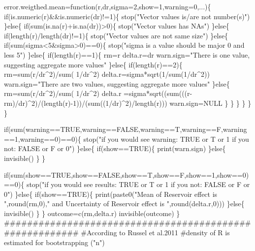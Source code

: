 \documentclass[
]{article}
\newenvironment{Shaded}{\begin{snugshade}}{\end{snugshade}}
\newcommand{\NormalTok}[1]{#1}
\begin{document}
\begin{Shaded}
\begin{Highlighting}[]
\NormalTok{error.weigthed.mean=function(r,dr,sigma=2,show=1,warning=0,...)\{}
\NormalTok{  if(is.numeric(r)\&\&is.numeric(dr)!=1)\{}
\NormalTok{    stop("Vector values is/are not number(s)") }
\NormalTok{  \}else\{  }
\NormalTok{    if(sum(is.na(r)+is.na(dr))\textgreater{}0)\{}
\NormalTok{      stop("Vector values has NAs") }
\NormalTok{    \}else\{ }
\NormalTok{      if(length(r)/length(dr)!=1)\{ }
\NormalTok{        stop("Vector values are not same size") }
\NormalTok{      \}else\{}
\NormalTok{        if(sum(sigma\textless{}5\&sigma\textgreater{}0)==0)\{}
\NormalTok{          stop("sigma is a value should be major 0 and less 5")}
\NormalTok{        \}else\{}
\NormalTok{          if(length(r)==1)\{}
\NormalTok{            rm=r}
\NormalTok{            delta.r=dr}
\NormalTok{            warn.sign="There is one value, suggesting aggregate more values"}
\NormalTok{          \}else\{    }
\NormalTok{          if(length(r)==2)\{}
\NormalTok{            rm=sum(r/dr\^{}2)/sum( 1/dr\^{}2)}
\NormalTok{            delta.r=sigma*sqrt(1/sum(1/dr\^{}2))}
\NormalTok{            warn.sign="There are two values, suggesting aggregate more values"}
\NormalTok{          \}else\{}
\NormalTok{            rm=sum(r/dr\^{}2)/sum( 1/dr\^{}2)}
\NormalTok{            delta.r =sigma*sqrt((sum(((r{-}rm)/dr)\^{}2)/(length(r){-}1))/(sum((1/dr)\^{}2)/length(r)))}
\NormalTok{            warn.sign=NULL}
\NormalTok{          \}}
\NormalTok{        \}}
\NormalTok{      \}}
\NormalTok{    \}}
\NormalTok{    \}}
\NormalTok{  \}}

\NormalTok{if(sum(warning==TRUE,warning==FALSE,warning==T,warning==F,warning==1,warning==0)==0)\{}
\NormalTok{    stop("if you would see warning: TRUE or T or 1 if you not: FALSE or F or 0") }
\NormalTok{  \}else\{  }
\NormalTok{    if(show==TRUE)\{}
\NormalTok{      print(warn.sign)}
\NormalTok{    \}else\{}
\NormalTok{      invisible()}
\NormalTok{    \}}
\NormalTok{  \}}

\NormalTok{if(sum(show==TRUE,show==FALSE,show==T,show==F,show==1,show==0)==0)\{}
\NormalTok{  stop("if you would see results: TRUE or T or 1 if you not: FALSE or F or 0") }
\NormalTok{  \}else\{  }
\NormalTok{    if(show==TRUE)\{}
\NormalTok{      print(paste0("Mean of Reservoir effect is ",round(rm,0)," and Uncertainty of Reservoir effect is ",round(delta.r,0)))}
\NormalTok{    \}else\{}
\NormalTok{      invisible()}
\NormalTok{    \}}
\NormalTok{  \}}
\NormalTok{outcome=c(rm,delta.r)}
\NormalTok{invisible(outcome)  }
\NormalTok{\}}
\NormalTok{\#\#\#\#\#\#\#\#\#\#\#\#\#\#\#\#\#\#\#\#\#\#\#\#\#\#\#\#\#\#\#\#\#\#\#\#\#\#\#\#\#\#\#\#\#\#\#\#\#\#\#\#\#\#\#\#}
\NormalTok{\#According to Russel et al.2011}
\NormalTok{\#density of R is estimated for bootstrapping ("n")}


\end{Highlighting}
\end{Shaded}
\end{document}
